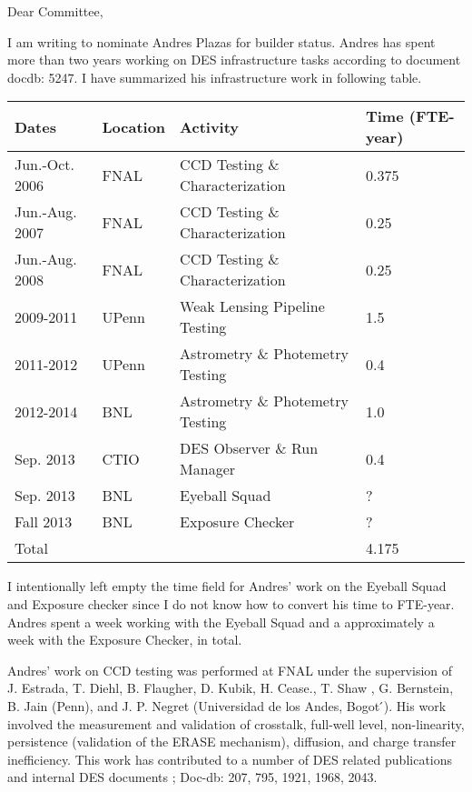 \documentclass[12pt]{letter}
\begin{document}
\begin{letter}{}

\opening{Dear Committee,}

I am writing to nominate Andres Plazas for builder status.  Andres has spent
more than two years working on DES infrastructure tasks according to document
docdb: 5247. I have summarized his infrastructure work in following table.

\begin{tabular}{|l|l|l|l|}
    \hline
    Dates              & Location & Activity                         & Time (FTE-year) \\ \hline \hline
    Jun.-Oct. 2006     & FNAL     & CCD Testing \& Characterization  & 0.375 \\
    Jun.-Aug. 2007     & FNAL     & CCD Testing \& Characterization  & 0.25  \\
    Jun.-Aug. 2008     & FNAL     & CCD Testing \& Characterization  & 0.25  \\
    \hline
    2009-2011          & UPenn    & Weak Lensing Pipeline Testing    & 1.5 \\
    \hline
    2011-2012          & UPenn    & Astrometry \& Photemetry Testing & 0.4 \\
    2012-2014          & BNL      & Astrometry \& Photemetry Testing & 1.0 \\
    \hline
    Sep. 2013          & CTIO     & DES Observer \& Run Manager      & 0.4 \\
    \hline 
    Sep. 2013          & BNL      & Eyeball Squad                    & ? \\
    \hline 
    Fall 2013          & BNL      & Exposure Checker                 & ? \\
    \hline
    \hline
    Total              &          &                                  & 4.175 \\
    \hline
\end{tabular}

I intentionally left empty the time field for Andres' work on the Eyeball Squad
and Exposure checker since I do not know how to convert his time to FTE-year.
Andres spent a week working with the Eyeball Squad and a approximately a week
with the Exposure Checker, in total.

Andres' work on CCD testing was performed at FNAL under the supervision of J.
Estrada, T. Diehl, B. Flaugher, D. Kubik, H. Cease., T. Shaw , G.  Bernstein,
B. Jain (Penn), and J. P. Negret (Universidad de los Andes, Bogot ́).  His work
involved the measurement and validation of crosstalk, full-well level,
non-linearity, persistence (validation of the ERASE mechanism), diffusion, and
charge transfer inefficiency.  This work has contributed to a number of
DES related publications and internal DES documents
\cite{Diehl2008,Flaugher2010,Flaugher2012}; Doc-db: 207, 795, 1921, 1968, 2043.


\end{letter}
\end{document}
